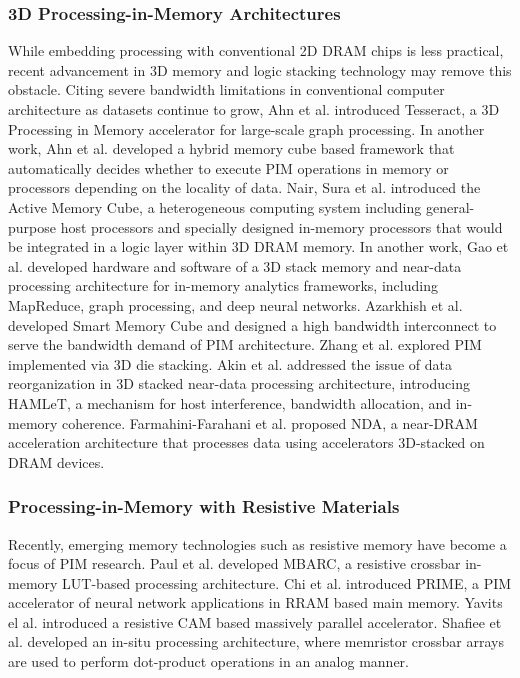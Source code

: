 \documentclass{superfri}
\begin{document}
	\subsubsection{3D Processing-in-Memory Architectures}
	\label{sec:3D_PiM}
	While embedding processing with conventional 2D DRAM chips is less practical, recent advancement in 3D memory and logic stacking technology may remove this obstacle. Citing severe bandwidth limitations in conventional computer architecture as datasets continue to grow, Ahn et al. \cite{ahn2015scalable} introduced Tesseract, a 3D Processing in Memory accelerator for large-scale graph processing. In another work, Ahn et al. \cite{ahn2015pim} developed a hybrid memory cube based framework that automatically decides whether to execute PIM operations in memory or processors depending on the locality of data. Nair, Sura et al. \cite{sura2015data}\cite{nair2015active} introduced the Active Memory Cube, a heterogeneous computing system including general-purpose host processors and specially designed in-memory processors that would be integrated in a logic layer within 3D DRAM memory. In another work, Gao et al. \cite{gao2015practical} developed hardware and software of a 3D stack memory and near-data processing architecture for in-memory analytics frameworks, including MapReduce, graph processing, and deep neural networks. Azarkhish et al. \cite{azarkhish2017logic} developed Smart Memory Cube and designed a high bandwidth interconnect to serve the bandwidth demand of PIM architecture. Zhang et al. \cite{zhang2014top} explored PIM implemented via 3D die stacking. Akin et al. \cite{akin2016hamlet} addressed the issue of data reorganization in 3D stacked near-data processing architecture, introducing HAMLeT, a mechanism for host interference, bandwidth allocation, and in-memory coherence. Farmahini-Farahani et al. \cite{farmahini2015nda} proposed NDA, a near-DRAM acceleration architecture that processes data using accelerators 3D-stacked on DRAM devices.
	
	\subsubsection{Processing-in-Memory with Resistive Materials}
	\label{sec:Resistive_PiM}
	Recently, emerging memory technologies such as resistive memory have become a focus of PIM research. Paul et al. \cite{paul2012scalable} developed MBARC, a resistive crossbar in-memory LUT-based processing architecture. Chi et al. \cite{chi2016prime} introduced PRIME, a PIM accelerator of neural network applications in RRAM based main memory. Yavits el al. \cite{yavits2015resistive} introduced a resistive CAM based massively parallel accelerator. Shafiee et al. \cite{shafiee2016isaac} developed an in-situ processing architecture, where memristor crossbar arrays are used to perform dot-product operations in an analog manner. 
	
\end{document}
